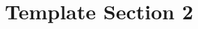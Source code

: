 \documentclass[../../main.tex]{subfiles}
\begin{document}
\section{Template Section 2}

\blindtext %
\end{document}
